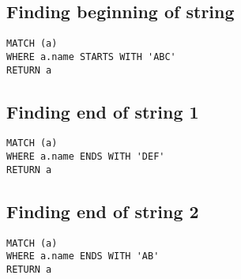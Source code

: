 \subsection{Finding beginning of string}

\begin{lstlisting}
MATCH (a)
WHERE a.name STARTS WITH 'ABC'
RETURN a
\end{lstlisting}

\subsection{Finding end of string 1}

\begin{lstlisting}
MATCH (a)
WHERE a.name ENDS WITH 'DEF'
RETURN a
\end{lstlisting}

\subsection{Finding end of string 2}

\begin{lstlisting}
MATCH (a)
WHERE a.name ENDS WITH 'AB'
RETURN a
\end{lstlisting}

